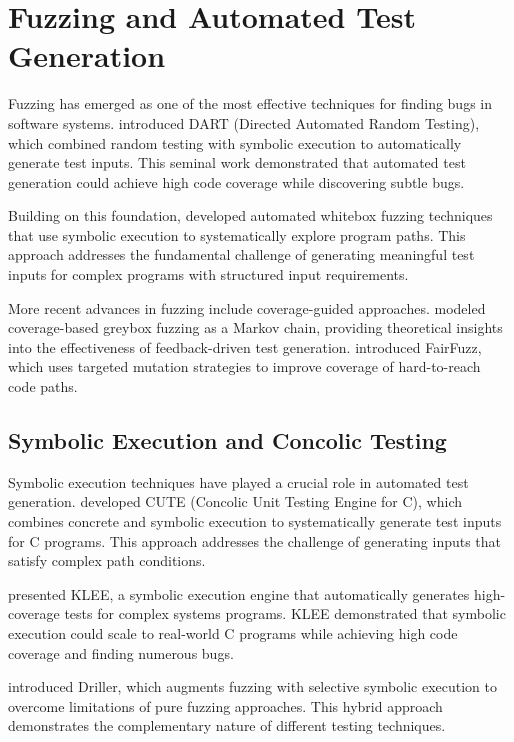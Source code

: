 \documentclass[doublespace,nopageskip]{VTthesis} %
\begin{document}
    \section{Fuzzing and Automated Test Generation} \label{se:fuzzing_approaches}
    
    Fuzzing has emerged as one of the most effective techniques for finding bugs in software systems. \citet{godefroid2005dart} introduced DART (Directed Automated Random Testing), which combined random testing with symbolic execution to automatically generate test inputs. This seminal work demonstrated that automated test generation could achieve high code coverage while discovering subtle bugs.
    
    Building on this foundation, \citet{godefroid2008automated} developed automated whitebox fuzzing techniques that use symbolic execution to systematically explore program paths. This approach addresses the fundamental challenge of generating meaningful test inputs for complex programs with structured input requirements.
    
    More recent advances in fuzzing include coverage-guided approaches. \citet{bohme2016coverage} modeled coverage-based greybox fuzzing as a Markov chain, providing theoretical insights into the effectiveness of feedback-driven test generation. \citet{lemieux2018fairfuzz} introduced FairFuzz, which uses targeted mutation strategies to improve coverage of hard-to-reach code paths.
    
    \subsection{Symbolic Execution and Concolic Testing}
    
    Symbolic execution techniques have played a crucial role in automated test generation. \citet{sen2005cute} developed CUTE (Concolic Unit Testing Engine for C), which combines concrete and symbolic execution to systematically generate test inputs for C programs. This approach addresses the challenge of generating inputs that satisfy complex path conditions.
    
    \citet{cadar2008klee} presented KLEE, a symbolic execution engine that automatically generates high-coverage tests for complex systems programs. KLEE demonstrated that symbolic execution could scale to real-world C programs while achieving high code coverage and finding numerous bugs.
    
    \citet{stephens2016driller} introduced Driller, which augments fuzzing with selective symbolic execution to overcome limitations of pure fuzzing approaches. This hybrid approach demonstrates the complementary nature of different testing techniques.
    
\end{document}
